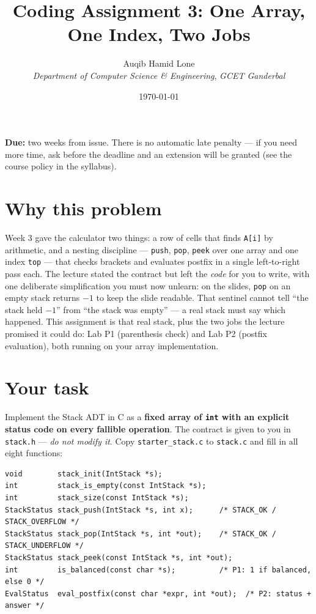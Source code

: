 \documentclass[11pt]{article}
\title{Coding Assignment 3: One Array, One Index, Two Jobs}
\author{Auqib Hamid Lone\\[0.3em]
  \emph{Department of Computer Science \& Engineering}, \emph{GCET Ganderbal}}
\date{\today}
\begin{document}
\maketitle

\noindent\textbf{Due:} two weeks from issue. There is no automatic late penalty --- if you need more time, ask before the deadline and an extension will be granted (see the course policy in the syllabus).

\section{Why this problem}

Week 3 gave the calculator two things: a row of cells that finds \texttt{A[i]} by arithmetic, and a nesting discipline --- \texttt{push}, \texttt{pop}, \texttt{peek} over one array and one index \texttt{top} --- that checks brackets and evaluates postfix in a single left-to-right pass each. The lecture stated the contract but left the \emph{code} for you to write, with one deliberate simplification you must now unlearn: on the slides, \texttt{pop} on an empty stack returns $-1$ to keep the slide readable. That sentinel cannot tell ``the stack held $-1$'' from ``the stack was empty'' --- a real stack must say which happened. This assignment is that real stack, plus the two jobs the lecture promised it could do: Lab P1 (parenthesis check) and Lab P2 (postfix evaluation), both running on your array implementation.

\section{Your task}

Implement the Stack ADT in C as a \textbf{fixed array of \texttt{int} with an explicit status code on every fallible operation}. The contract is given to you in \texttt{stack.h} --- \emph{do not modify it}. Copy \texttt{starter\_stack.c} to \texttt{stack.c} and fill in all eight functions:

\begin{verbatim}
void        stack_init(IntStack *s);
int         stack_is_empty(const IntStack *s);
int         stack_size(const IntStack *s);
StackStatus stack_push(IntStack *s, int x);      /* STACK_OK / STACK_OVERFLOW */
StackStatus stack_pop(IntStack *s, int *out);    /* STACK_OK / STACK_UNDERFLOW */
StackStatus stack_peek(const IntStack *s, int *out);
int         is_balanced(const char *s);          /* P1: 1 if balanced, else 0 */
EvalStatus  eval_postfix(const char *expr, int *out);  /* P2: status + answer */
\end{verbatim}
\end{document}
